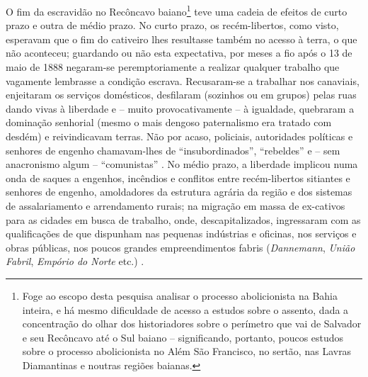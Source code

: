 O fim da escravidão no Recôncavo baiano\footnote{Foge ao escopo desta pesquisa analisar o processo abolicionista na Bahia inteira, e há mesmo dificuldade de acesso a estudos sobre o assento, dada a concentração do olhar dos historiadores sobre o perímetro que vai de Salvador e seu Recôncavo até o Sul baiano -- significando, portanto, poucos estudos sobre o processo abolicionista no Além São Francisco, no sertão, nas Lavras Diamantinas e noutras regiões baianas.} teve uma cadeia de efeitos de curto prazo e outra de médio prazo. No curto prazo, os recém-libertos, como visto, esperavam que o fim do cativeiro lhes resultasse também no acesso à terra, o que não aconteceu; guardando ou não esta expectativa, por meses a fio após o 13 de maio de 1888 negaram-se peremptoriamente a realizar qualquer trabalho que vagamente lembrasse a condição escrava. Recusaram-se a trabalhar nos canaviais, enjeitaram os serviços domésticos, desfilaram (sozinhos ou em grupos) pelas ruas dando vivas à liberdade e -- muito provocativamente -- à igualdade, quebraram a dominação senhorial (mesmo o mais dengoso paternalismo era tratado com desdém) e reivindicavam terras. Não por acaso, policiais, autoridades políticas e senhores de engenho chamavam-lhes de ``insubordinados'', ``rebeldes'' e -- sem anacronismo algum -- ``comunistas'' \cite[p.~119-160]{fraga_encruzilhadas_2014}. No médio prazo, a liberdade implicou numa onda de saques a engenhos, incêndios e conflitos entre recém-libertos sitiantes e senhores de engenho, amoldadores da estrutura agrária da região e dos sistemas de assalariamento e arrendamento rurais; na migração em massa de ex-cativos para as cidades em busca de trabalho, onde, descapitalizados, ingressaram com as qualificações de que dispunham nas pequenas indústrias e oficinas, nos serviços e obras públicas, nos poucos grandes empreendimentos fabris (\textit{Dannemann}, \textit{União Fabril}, \textit{Empório do Norte} etc.) \cite[p.~161-241]{fraga_encruzilhadas_2014}.

